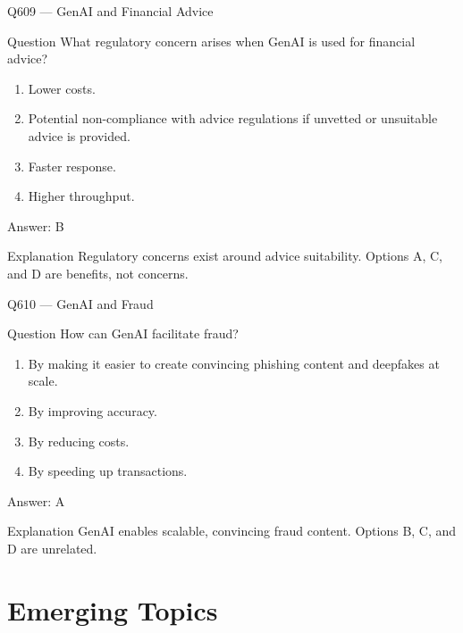 \documentclass[aspectratio=169,8pt]{beamer}
\begin{document}
	\begin{frame}{Q609 --- GenAI and Financial Advice}
		\begin{block}{Question}
			What regulatory concern arises when GenAI is used for financial advice?
			\begin{enumerate}
				\item Lower costs.
				\item Potential non-compliance with advice regulations if unvetted or unsuitable advice is provided.
				\item Faster response.
				\item Higher throughput.
			\end{enumerate}
		\end{block}
		\begin{exampleblock}{Answer: B}\end{exampleblock}
		\begin{block}{Explanation}
			Regulatory concerns exist around advice suitability. Options A, C, and D are benefits, not concerns.
		\end{block}
	\end{frame}
	
	\begin{frame}{Q610 --- GenAI and Fraud}
		\begin{block}{Question}
			How can GenAI facilitate fraud?
			\begin{enumerate}
				\item By making it easier to create convincing phishing content and deepfakes at scale.
				\item By improving accuracy.
				\item By reducing costs.
				\item By speeding up transactions.
			\end{enumerate}
		\end{block}
		\begin{exampleblock}{Answer: A}\end{exampleblock}
		\begin{block}{Explanation}
			GenAI enables scalable, convincing fraud content. Options B, C, and D are unrelated.
		\end{block}
	\end{frame}
	
	\section{Emerging Topics}
	
\end{document}
